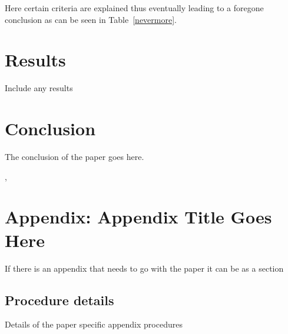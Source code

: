 Here certain criteria are explained thus eventually
leading to a foregone conclusion as can be seen in
Table~\ref{nevermore}.

\begin{table}[h!tb] \centering
\setlength{\captionwidth}{3.5 in}
\label{nevermore}

\vspace{ 2 in}
\end{table}

\section{Results}
Include any results

\section{Conclusion}\label{conclusion2}

The conclusion of the paper goes here.

\cite{Rea85}
\cite{Enf87}, \cite{Dau75} 
\cite{KPS75}





% 
%     

\section{Appendix: Appendix Title Goes Here}
If there is an appendix that needs to go with the paper it can be as a section \cite{Aup91}

\subsection{Procedure details}
Details of the paper specific appendix procedures

